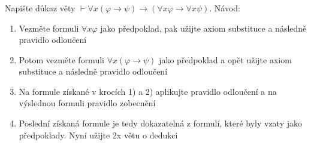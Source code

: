 ﻿\subsubsection{}
Napište důkaz věty $\vdash \forall x (\varphi \rightarrow \psi) \rightarrow
(\forall x \varphi \rightarrow \forall x \psi)$. Návod:

\begin{enumerate}
  \item Vezměte formuli $\forall x \varphi$ jako předpoklad, pak užijte axiom substituce a
následně pravidlo odloučení
  \item Potom vezměte formuli $\forall x (\varphi \rightarrow \psi)$ jako předpoklad a opět užijte axiom
substituce a následně pravidlo odloučení
  \item Na formule získané v krocích 1) a 2) aplikujte pravidlo odloučení a na
výslednou formuli pravidlo zobecnění
  \item Poslední získaná formule je tedy dokazatelná z formulí, které byly vzaty
jako předpoklady. Nyní užijte 2x větu o dedukci
\end{enumerate}
